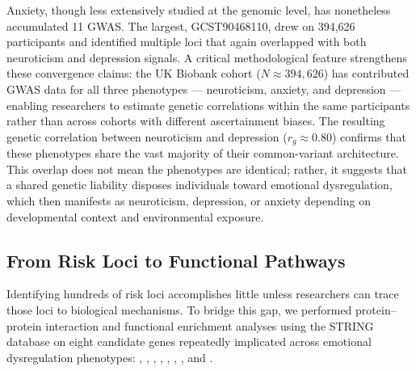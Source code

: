 Anxiety, though less extensively studied at the genomic level, has nonetheless
accumulated 11 GWAS.\cite{purves2020}
The largest, GCST90468110, drew on 394,626 participants and identified multiple
loci that again overlapped with both neuroticism and depression signals.
A critical methodological feature strengthens these convergence claims: the UK
Biobank cohort ($N \approx 394{,}626$) has contributed GWAS data for all three
phenotypes — neuroticism, anxiety, and depression — enabling researchers to
estimate genetic correlations within the same participants rather than across
cohorts with different ascertainment biases.\cite{nagel2018}
The resulting genetic correlation between neuroticism and depression
($r_g \approx 0.80$) confirms that these phenotypes share the vast majority of
their common-variant architecture.\cite{nagel2018}
This overlap does not mean the phenotypes are identical; rather, it suggests
that a shared genetic liability disposes individuals toward emotional
dysregulation, which then manifests as neuroticism, depression, or anxiety
depending on developmental context and environmental exposure.

\subsection*{From Risk Loci to Functional Pathways}

Identifying hundreds of risk loci accomplishes little unless researchers can
trace those loci to biological mechanisms.
To bridge this gap, we performed protein--protein interaction and functional
enrichment analyses using the STRING database on eight candidate genes
repeatedly implicated across emotional dysregulation phenotypes:
, , , , ,
, , and .\cite{szklarczyk2023}

